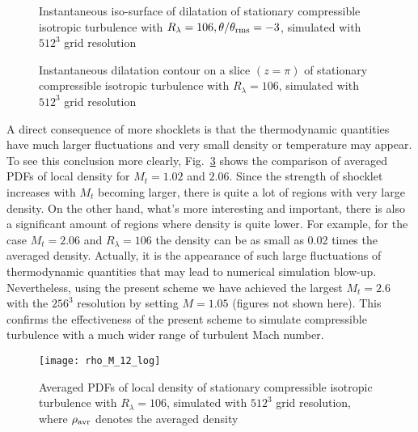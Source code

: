 \documentclass[review]{elsarticle}
\begin{document}
\begin{figure}
  \centering
  \caption{Instantaneous iso-surface of dilatation of stationary compressible isotropic turbulence with $R_\lambda = 106, \theta/\theta_{\rm rms} = -3$, simulated with $512^3$ grid resolution}
  \label{fig.theta-3D}
\end{figure}

\begin{figure}
  \centering
  \caption{Instantaneous dilatation contour on a slice $(z=\pi)$ of stationary compressible isotropic turbulence with $R_\lambda = 106$, simulated with $512^3$ grid resolution}
  \label{fig.theta-slice}
\end{figure}

A direct consequence of more shocklets is that the thermodynamic quantities have much larger fluctuations and very small density or temperature may appear. To see this conclusion more clearly, Fig.~\ref{fig.rhoM12} shows the comparison of averaged PDFs of local density for $M_t=1.02$ and $2.06$. Since the strength of shocklet increases with $M_t$ becoming larger, there is quite a lot of regions with very large density. On the other hand, what's more interesting and important, there is also a significant amount of regions where density is quite lower. For example, for the case $M_t = 2.06$ and $R_\lambda=106$ the density can be as small as 0.02 times the averaged density. Actually, it is the appearance of such large fluctuations of thermodynamic quantities that may lead to numerical simulation blow-up. Nevertheless, using the present scheme we have achieved the largest $M_t=2.6$ with the $256^3$ resolution by setting $M=1.05$ (figures not shown here). This confirms the effectiveness of the present scheme to simulate compressible turbulence with a much wider range of turbulent Mach number.

\begin{figure}
  \centering
  \texttt{[image: rho\_M\_12\_log]}
  \caption{Averaged PDFs of local density of stationary compressible isotropic turbulence with $R_\lambda = 106$, simulated with $512^3$ grid resolution, where $\rho_{\rm avr}$ denotes the averaged density}
  \label{fig.rhoM12}
\end{figure}
\end{document}
